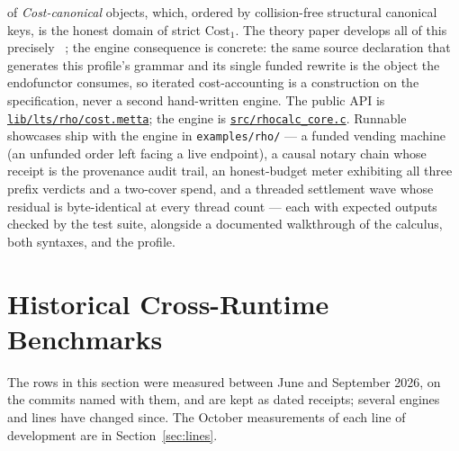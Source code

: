 \documentclass[11pt]{article}
\newcommand{\code}[1]{\texttt{#1}}
\begin{document}
of \emph{Cost-canonical} objects, which, ordered by collision-free
structural canonical keys, is the honest domain of strict
$\mathrm{Cost}_1$.  The theory paper develops all of this precisely
~\cite{rhocost-companion}; the engine consequence is concrete: the same
source declaration that generates this profile's grammar and its single
funded rewrite is the object the endofunctor consumes, so iterated
cost-accounting is a construction on the specification, never a second
hand-written engine.  The public API is
\href{https://github.com/zariuq/CeTTa/blob/e23de3043462d80e27f9c9009bd0f1b955ed140c/lib/lts/rho/cost.metta}{\code{lib/lts/rho/cost.metta}};
the engine is
\href{https://github.com/zariuq/CeTTa/blob/e23de3043462d80e27f9c9009bd0f1b955ed140c/src/rhocalc_core.c}{\code{src/rhocalc\_core.c}}.
Runnable showcases ship with the engine in \code{examples/rho/} --- a funded vending machine
(an unfunded order left facing a live endpoint), a causal notary chain whose receipt is the
provenance audit trail, an honest-budget meter exhibiting all three prefix verdicts and a
two-cover spend, and a threaded settlement wave whose residual is byte-identical at every
thread count --- each with expected outputs checked by the test suite, alongside a documented
walkthrough of the calculus, both syntaxes, and the profile.

\section{Historical Cross-Runtime Benchmarks}
\label{sec:benchmark-programs}

The rows in this section were measured between June and September 2026, on
the commits named with them, and are kept as dated receipts; several engines
and lines have changed since.  The October measurements of each line of
development are in Section~\ref{sec:lines}.
\end{document}
